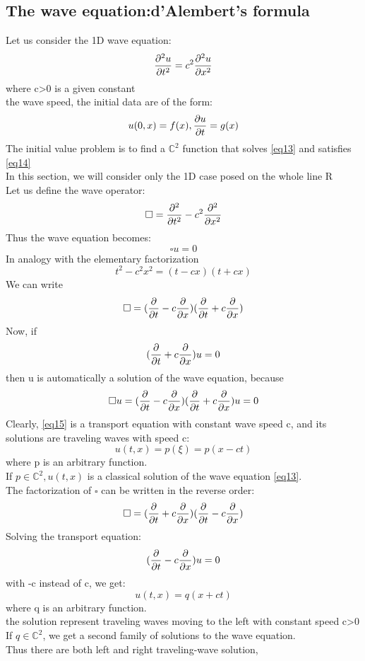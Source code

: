 \subsection{The wave equation:d'Alembert's formula}
Let us consider the 1D wave equation:
\begin{equation}
    \label{eq13} \pdv[2]{u}{t}=c^2\pdv[2]{u}{x}
\end{equation}
where c>0 is a given constant\\
the wave speed, the initial data are of the form:
\begin{equation}
    \label{eq14} u(0,x)=f(x),\pdv{u}{t}(0,x)=g(x)
\end{equation}
The initial value problem is to find a $ \mathbb{C}^2 $ function that solves \eqref{eq13} and satisfies \eqref{eq14}\\
In this section, we will consider only the 1D case posed on the whole line R\\
Let us define the wave operator:
$$
    \square =\pdv[2]{}{t}-c^2\pdv[2]{}{x}
$$ 
Thus the wave equation becomes:
$$
    \square u=0
$$
In analogy with the elementary factorization
$$
    t^2-c^2x^2=(t-cx)(t+cx)
$$ 
We can write 
$$
    \square=(\pdv{}{t}-c\pdv{}{x})(\pdv{}{t}+c\pdv{}{x})
$$
Now, if
\begin{equation}
     \label{eq15}(\pdv{}{t}+c\pdv{}{x})u=0
\end{equation}
then u is automatically a solution of the wave equation, because
$$
    \square u=(\pdv{}{t}-c\pdv{}{x})(\pdv{}{t}+c\pdv{}{x})u=0
$$
Clearly, \eqref{eq15} is a transport equation with constant wave speed c, and its solutions are traveling waves with speed c:
$$
    u(t,x)=p(\xi)=p(x-ct)
$$
where p is an arbitrary function.\\
If $ p\in \mathbb{C}^2,u(t,x) $ is a classical solution of the wave equation \eqref{eq13}.\\
The factorization of $ \square $ can be written in the reverse order:
$$
    \square=(\pdv{}{t}+c\pdv{}{x})(\pdv{}{t}-c\pdv{}{x})
$$
Solving the transport equation:
$$
    (\pdv{}{t}-c\pdv{}{x})u=0
$$
with -c instead of c, we get:
$$
    u(t,x)=q(x+ct)
$$ 
where q is an arbitrary function.\\
the solution represent traveling waves moving to the left with constant speed c>0\\
If $ q\in \mathbb{C}^2$, we get a second family of solutions to the wave equation.\\
Thus there are both left and right traveling-wave solution,\\
